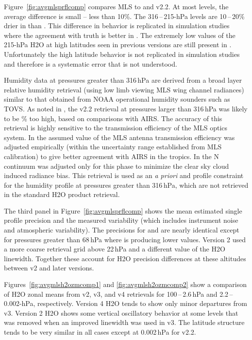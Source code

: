 \documentclass[11pt,draft]{report}
\begin{document}
Figure~\ref{fig:avgmlsprflcomp} compares MLS \thisv to \prevvSlash and
v2.2. At most levels, the average difference is small -- less than
10\%. The 316\,--\,215-hPa levels are 10\,--\,20\% drier in \thisv than
\prevv. This difference in behavior is replicated in simulation studies
where the agreement with truth is better in \thisv. The extremely low
values of the 215-hPa H\cs2O at high latitudes seen in previous versions
are still present in \thisv. Unfortunately the high latitude behavior is
not replicated in simulation studies and therefore is a systematic error
that is not understood.

Humidity data at pressures greater than 316\,hPa are derived from a
broad layer relative humidity retrieval (using low limb viewing MLS wing
channel radiances) similar to that obtained from NOAA operational
humidity sounders such as TOVS\@. As noted in \citep{ReadEtal07}, the
v2.2 retrieval at pressures larger than 316\,hPa was likely to be
\% too high, based on comparisons with AIRS\@. The
accuracy of this retrieval is highly sensitive to the transmission
efficiency of the MLS optics system. In \prevv the assumed value of the
MLS antenna transmission efficiency was adjusted empirically (within the
uncertainty range established from MLS calibration) to give better
agreement with AIRS in the tropics. In \thisv the N continuum was
adjusted only for this phase to minimize the clear sky cloud induced
radiance bias. This retrieval is used as an \emph{a priori} and profile
constraint for the humidity profile at pressures greater than 316\,hPa,
which are not retrieved in the standard H\cs2O product retrieval.

\sloppypar The third panel in Figure~\ref{fig:avgmlsprflcomp} shows the mean
estimated single profile precision and the measured variability (which
includes instrument noise and atmospheric variability). The precisions
for \thisv and \prevvSlash are nearly identical except for pressures
greater than 68\,hPa where \thisv is producing lower values. Version 2
used a more coarse retrieval grid above 22\,hPa and a different value of
the H\cs2O linewidth.  Together these account for H\cs2O precision
differences at these altitudes between v2 and later versions.

Figures~\ref{fig:avgmlsh2ozmcomp1} and \ref{fig:avgmlsh2ozmcomp2} show a
comparison of H\cs2O zonal means from v2, v3, and v4 retrievals for
100\,--\,2.6\,hPa and 2.2\,--\,0.002-hPa, respectively. Version 4 H\cs2O
tends to show only minor departures from v3. Version 2 H\cs2O shows some
vertical oscillatory behavior at some levels that was removed when an
improved linewidth was used in v3. The latitude structure tends to be
very similar in all cases except at 0.002\,hPa for v2.2.
\end{document}
